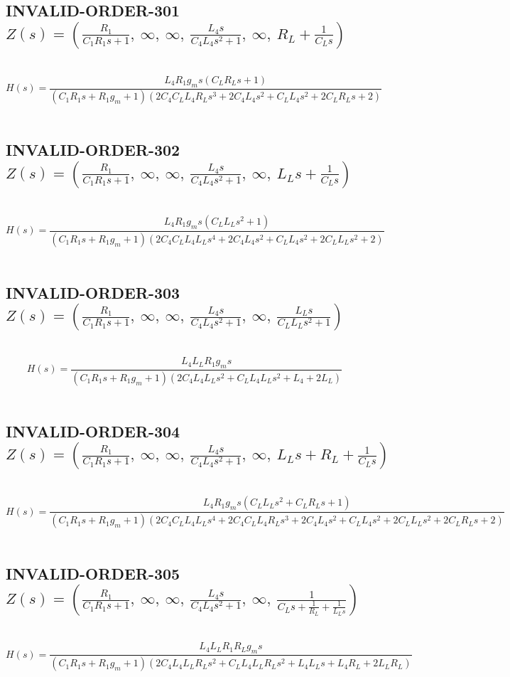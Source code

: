 \documentclass{article}
\begin{document}
\subsection{INVALID-ORDER-301 $Z(s) = \left( \frac{R_{1}}{C_{1} R_{1} s + 1}, \  \infty, \  \infty, \  \frac{L_{4} s}{C_{4} L_{4} s^{2} + 1}, \  \infty, \  R_{L} + \frac{1}{C_{L} s}\right)$ } \ 
\textbf{\[H(s) = \frac{L_{4} R_{1} g_{m} s \left(C_{L} R_{L} s + 1\right)}{\left(C_{1} R_{1} s + R_{1} g_{m} + 1\right) \left(2 C_{4} C_{L} L_{4} R_{L} s^{3} + 2 C_{4} L_{4} s^{2} + C_{L} L_{4} s^{2} + 2 C_{L} R_{L} s + 2\right)}\] } \ 
\subsection{INVALID-ORDER-302 $Z(s) = \left( \frac{R_{1}}{C_{1} R_{1} s + 1}, \  \infty, \  \infty, \  \frac{L_{4} s}{C_{4} L_{4} s^{2} + 1}, \  \infty, \  L_{L} s + \frac{1}{C_{L} s}\right)$ } \ 
\textbf{\[H(s) = \frac{L_{4} R_{1} g_{m} s \left(C_{L} L_{L} s^{2} + 1\right)}{\left(C_{1} R_{1} s + R_{1} g_{m} + 1\right) \left(2 C_{4} C_{L} L_{4} L_{L} s^{4} + 2 C_{4} L_{4} s^{2} + C_{L} L_{4} s^{2} + 2 C_{L} L_{L} s^{2} + 2\right)}\] } \ 
\subsection{INVALID-ORDER-303 $Z(s) = \left( \frac{R_{1}}{C_{1} R_{1} s + 1}, \  \infty, \  \infty, \  \frac{L_{4} s}{C_{4} L_{4} s^{2} + 1}, \  \infty, \  \frac{L_{L} s}{C_{L} L_{L} s^{2} + 1}\right)$ } \ 
\textbf{\[H(s) = \frac{L_{4} L_{L} R_{1} g_{m} s}{\left(C_{1} R_{1} s + R_{1} g_{m} + 1\right) \left(2 C_{4} L_{4} L_{L} s^{2} + C_{L} L_{4} L_{L} s^{2} + L_{4} + 2 L_{L}\right)}\] } \ 
\subsection{INVALID-ORDER-304 $Z(s) = \left( \frac{R_{1}}{C_{1} R_{1} s + 1}, \  \infty, \  \infty, \  \frac{L_{4} s}{C_{4} L_{4} s^{2} + 1}, \  \infty, \  L_{L} s + R_{L} + \frac{1}{C_{L} s}\right)$ } \ 
\textbf{\[H(s) = \frac{L_{4} R_{1} g_{m} s \left(C_{L} L_{L} s^{2} + C_{L} R_{L} s + 1\right)}{\left(C_{1} R_{1} s + R_{1} g_{m} + 1\right) \left(2 C_{4} C_{L} L_{4} L_{L} s^{4} + 2 C_{4} C_{L} L_{4} R_{L} s^{3} + 2 C_{4} L_{4} s^{2} + C_{L} L_{4} s^{2} + 2 C_{L} L_{L} s^{2} + 2 C_{L} R_{L} s + 2\right)}\] } \ 
\subsection{INVALID-ORDER-305 $Z(s) = \left( \frac{R_{1}}{C_{1} R_{1} s + 1}, \  \infty, \  \infty, \  \frac{L_{4} s}{C_{4} L_{4} s^{2} + 1}, \  \infty, \  \frac{1}{C_{L} s + \frac{1}{R_{L}} + \frac{1}{L_{L} s}}\right)$ } \ 
\textbf{\[H(s) = \frac{L_{4} L_{L} R_{1} R_{L} g_{m} s}{\left(C_{1} R_{1} s + R_{1} g_{m} + 1\right) \left(2 C_{4} L_{4} L_{L} R_{L} s^{2} + C_{L} L_{4} L_{L} R_{L} s^{2} + L_{4} L_{L} s + L_{4} R_{L} + 2 L_{L} R_{L}\right)}\] } \ 
\end{document}
